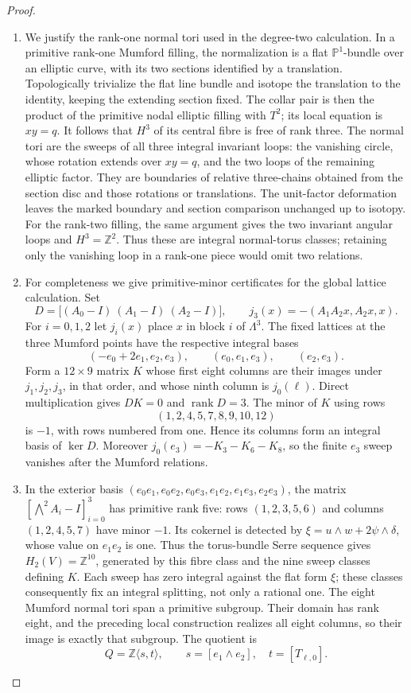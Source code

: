 \begin{proof}
\begin{enumerate}[label=\arabic*.,leftmargin=*]
\item We justify the rank-one normal tori used in the degree-two
calculation. In a primitive rank-one Mumford filling, the
normalization is a flat $\mathbb P^1$-bundle over an elliptic
curve, with its two sections identified by a translation.
Topologically trivialize the flat line bundle and isotope the
translation to the identity, keeping the extending section fixed.
The collar pair is then the product of the primitive nodal
elliptic filling with $T^2$; its local equation is $xy=q$.
It follows that $H^3$ of its central fibre is free of rank three.
The normal tori are the sweeps of all three integral invariant
loops: the vanishing circle, whose rotation extends over $xy=q$,
and the two loops of the remaining elliptic factor. They are
boundaries of relative three-chains obtained from the section
disc and those rotations or translations. The unit-factor
deformation leaves the marked boundary and section comparison
unchanged up to isotopy. For the rank-two filling, the same
argument gives the two invariant angular loops and $H^3=\mathbb Z^2$.
Thus these are integral normal-torus classes; retaining only the
vanishing loop in a rank-one piece would omit two relations.

\item For completeness we give primitive-minor certificates for the
global lattice calculation. Set
\[
 D=\bigl[(A_0-I)\ (A_1-I)\ (A_2-I)\bigr],
 \qquad
 j_3(x)=-(A_1A_2x,A_2x,x).
\]
For $i=0,1,2$ let $j_i(x)$ place $x$ in block $i$ of
$\Lambda^3$. The fixed lattices at the three Mumford points have
the respective integral bases
\[
 (-e_0+2e_1,e_2,e_3),\qquad (e_0,e_1,e_3),\qquad(e_2,e_3).
\]
Form a $12\times9$ matrix $K$ whose first eight columns are
their images under $j_1,j_2,j_3$, in that order, and whose ninth
column is $j_0(\ell)$. Direct multiplication gives $DK=0$ and
$\operatorname{rank}D=3$. The minor of $K$ using rows
\[
 (1,2,4,5,7,8,9,10,12)
\]
is $-1$, with rows numbered from one. Hence its columns form
an integral basis of $\ker D$. Moreover
$j_0(e_3)=-K_3-K_6-K_8$, so the finite $e_3$ sweep vanishes
after the Mumford relations.

\item In the exterior basis
$(e_0e_1,e_0e_2,e_0e_3,e_1e_2,e_1e_3,e_2e_3)$,
the matrix $[\bigwedge^2A_i-I]_{i=0}^3$ has primitive rank five:
rows $(1,2,3,5,6)$ and columns $(1,2,4,5,7)$ have minor $-1$.
Its cokernel is detected by
$\xi=u\wedge w+2\psi\wedge\delta$, whose value on $e_1e_2$
is one. Thus the torus-bundle Serre sequence gives
$H_2(V)=\mathbb Z^{10}$, generated by this fibre class and
the nine sweep classes defining $K$. Each sweep has zero
integral against the flat form $\xi$; these classes consequently
fix an integral splitting, not only a rational one.
The eight Mumford normal tori span a primitive subgroup.
Their domain has rank eight, and the preceding local construction
realizes all eight columns, so their image is exactly that subgroup.
The quotient is
\[
 Q=\mathbb Z\langle s,t\rangle,
 \qquad s=[e_1\wedge e_2],\quad t=[T_{\ell,0}].
\]


\end{enumerate}
\end{proof}
